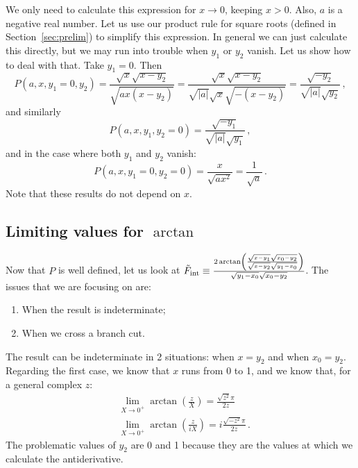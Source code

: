 \documentclass[twoside]{article}
\begin{document}
We only need to calculate this expression for $x \to 0$, keeping $x>0$. Also, $a$ is a negative real number. Let us use our product rule for square roots (defined in Section~\ref{sec:prelim}) to simplify this expression. In general we can just calculate this directly, but we may run into trouble when $y_1$ or $y_2$ vanish. Let us show how to deal with that.
Take $y_1=0$. Then
\begin{equation}
P(a,x,y_1=0,y_2) = \frac{\sqrt{x}\sqrt{x-y_2}}{\sqrt{a x (x-y_2)}} = \frac{\sqrt{x}\sqrt{x-y_2}}{\sqrt{|a|}\sqrt{x}\sqrt{-(x-y_2)}} =  \frac{\sqrt{-y_2}}{\sqrt{|a|}\sqrt{y_2}}\,,
\end{equation}
and similarly
\begin{equation}
P(a,x,y_1,y_2=0) =  \frac{\sqrt{-y_1}}{\sqrt{|a|}\sqrt{y_1}}\,,
\end{equation}
and in the case where both $y_1$ and $y_2$ vanish:
\begin{equation}
P(a,x,y_1=0,y_2=0) = \frac{x}{\sqrt{a x^2}} = \frac{1}{\sqrt{a}} \,.
\end{equation}
Note that these results do not depend on $x$.

\subsection{Limiting values for $\arctan$}

Now that $P$ is well defined, let us look at $\tilde{F}_{\rm int} \equiv \frac{2 \arctan\left(\frac{\sqrt{x-y_1} \sqrt{x_0-y_2}}{\sqrt{x-y_2} \sqrt{y_1-x_0}}\right)}{\sqrt{y_1 - x_0}\sqrt{x_0 - y_2}}$. The issues that we are focusing on are:
\begin{enumerate}
\item When the result is indeterminate;
\item When we cross a branch cut.
\end{enumerate}

The result can be indeterminate in 2 situations: when $x=y_2$ and when $x_0 = y_2$.
Regarding the first case, we know that $x$ runs from 0 to 1, and we know that, for a general complex $z$:
\begin{align}
&\lim_{X \to 0^+} \arctan\left(\frac{z}{X}\right) = \frac{\sqrt{z^2}\pi}{2 z} \label{eq:limit1}\\
&\lim_{X \to 0^+} \arctan\left(\frac{z}{i X}\right) = i \frac{\sqrt{-z^2}\pi}{2 z}\,. \label{eq:limit2}
\end{align} 
The problematic values of $y_2$ are 0 and 1 because they are the values at which we calculate the antiderivative. 
\end{document}
